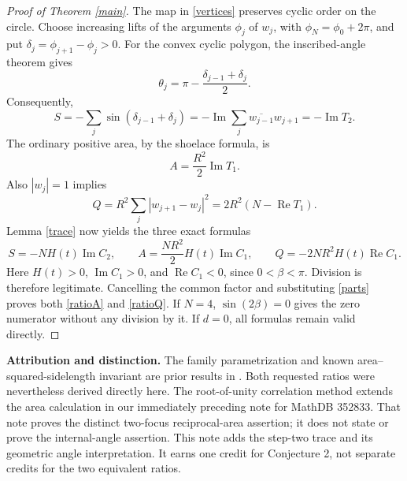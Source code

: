 \documentclass[11pt]{article}
\begin{document}
\begin{proof}[Proof of Theorem \ref{main}]
The map in \eqref{vertices} preserves cyclic order on the circle.
Choose increasing lifts of the arguments $\phi_j$ of $w_j$, with
$\phi_N=\phi_0+2\pi$, and put $\delta_j=\phi_{j+1}-\phi_j>0$.
For the convex cyclic polygon, the inscribed-angle theorem gives
\[
 \theta_j=\pi-\frac{\delta_{j-1}+\delta_j}{2}.
\]
Consequently,
\begin{equation}\label{angletrace}
 S=-\sum_j\sin(\delta_{j-1}+\delta_j)
   =-\operatorname{Im}\sum_j\overline{w_{j-1}}w_{j+1}
   =-\operatorname{Im}T_2.
\end{equation}
The ordinary positive area, by the shoelace formula, is
\begin{equation}\label{areatrace}
 A=\frac{R^2}{2}\operatorname{Im}T_1.
\end{equation}
Also $|w_j|=1$ implies
\begin{equation}\label{sidetrace}
 Q=R^2\sum_j|w_{j+1}-w_j|^2
  =2R^2(N-\operatorname{Re}T_1).
\end{equation}
Lemma \ref{trace} now yields the three exact formulas
\[
 S=-NH(t)\operatorname{Im}C_2,\qquad
 A=\frac{NR^2}{2}H(t)\operatorname{Im}C_1,\qquad
 Q=-2NR^2H(t)\operatorname{Re}C_1.
\]
Here $H(t)>0$, $\operatorname{Im}C_1>0$, and
$\operatorname{Re}C_1<0$, since $0<\beta<\pi$.
Division is therefore legitimate. Cancelling the common factor and
substituting \eqref{parts} proves both \eqref{ratioA} and \eqref{ratioQ}.
If $N=4$, $\sin(2\beta)=0$ gives the zero numerator without any division
by it. If $d=0$, all formulas remain valid directly.
\end{proof}

\noindent\textbf{Attribution and distinction.}
The family parametrization and known area--squared-sidelength invariant
are prior results in \cite{GRR}. Both requested ratios were nevertheless
derived directly here. The root-of-unity correlation method extends the
area calculation in our immediately preceding note for MathDB 352833.
That note proves the distinct two-focus reciprocal-area assertion; it
does not state or prove the internal-angle assertion. This note adds the
step-two trace and its geometric angle interpretation. It earns one
credit for Conjecture 2, not separate credits for the two equivalent ratios.
\end{document}
